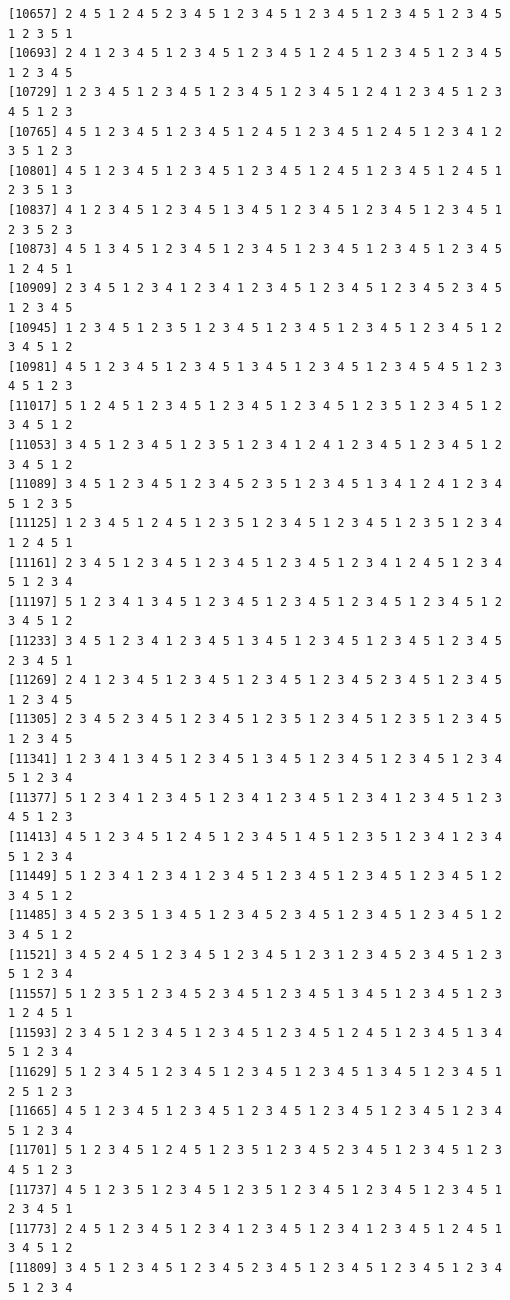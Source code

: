 \documentclass[
  11pt,
]{book}
\begin{document}
\begin{verbatim}
[10657] 2 4 5 1 2 4 5 2 3 4 5 1 2 3 4 5 1 2 3 4 5 1 2 3 4 5 1 2 3 4 5 1 2 3 5 1
[10693] 2 4 1 2 3 4 5 1 2 3 4 5 1 2 3 4 5 1 2 4 5 1 2 3 4 5 1 2 3 4 5 1 2 3 4 5
[10729] 1 2 3 4 5 1 2 3 4 5 1 2 3 4 5 1 2 3 4 5 1 2 4 1 2 3 4 5 1 2 3 4 5 1 2 3
[10765] 4 5 1 2 3 4 5 1 2 3 4 5 1 2 4 5 1 2 3 4 5 1 2 4 5 1 2 3 4 1 2 3 5 1 2 3
[10801] 4 5 1 2 3 4 5 1 2 3 4 5 1 2 3 4 5 1 2 4 5 1 2 3 4 5 1 2 4 5 1 2 3 5 1 3
[10837] 4 1 2 3 4 5 1 2 3 4 5 1 3 4 5 1 2 3 4 5 1 2 3 4 5 1 2 3 4 5 1 2 3 5 2 3
[10873] 4 5 1 3 4 5 1 2 3 4 5 1 2 3 4 5 1 2 3 4 5 1 2 3 4 5 1 2 3 4 5 1 2 4 5 1
[10909] 2 3 4 5 1 2 3 4 1 2 3 4 1 2 3 4 5 1 2 3 4 5 1 2 3 4 5 2 3 4 5 1 2 3 4 5
[10945] 1 2 3 4 5 1 2 3 5 1 2 3 4 5 1 2 3 4 5 1 2 3 4 5 1 2 3 4 5 1 2 3 4 5 1 2
[10981] 4 5 1 2 3 4 5 1 2 3 4 5 1 3 4 5 1 2 3 4 5 1 2 3 4 5 4 5 1 2 3 4 5 1 2 3
[11017] 5 1 2 4 5 1 2 3 4 5 1 2 3 4 5 1 2 3 4 5 1 2 3 5 1 2 3 4 5 1 2 3 4 5 1 2
[11053] 3 4 5 1 2 3 4 5 1 2 3 5 1 2 3 4 1 2 4 1 2 3 4 5 1 2 3 4 5 1 2 3 4 5 1 2
[11089] 3 4 5 1 2 3 4 5 1 2 3 4 5 2 3 5 1 2 3 4 5 1 3 4 1 2 4 1 2 3 4 5 1 2 3 5
[11125] 1 2 3 4 5 1 2 4 5 1 2 3 5 1 2 3 4 5 1 2 3 4 5 1 2 3 5 1 2 3 4 1 2 4 5 1
[11161] 2 3 4 5 1 2 3 4 5 1 2 3 4 5 1 2 3 4 5 1 2 3 4 1 2 4 5 1 2 3 4 5 1 2 3 4
[11197] 5 1 2 3 4 1 3 4 5 1 2 3 4 5 1 2 3 4 5 1 2 3 4 5 1 2 3 4 5 1 2 3 4 5 1 2
[11233] 3 4 5 1 2 3 4 1 2 3 4 5 1 3 4 5 1 2 3 4 5 1 2 3 4 5 1 2 3 4 5 2 3 4 5 1
[11269] 2 4 1 2 3 4 5 1 2 3 4 5 1 2 3 4 5 1 2 3 4 5 2 3 4 5 1 2 3 4 5 1 2 3 4 5
[11305] 2 3 4 5 2 3 4 5 1 2 3 4 5 1 2 3 5 1 2 3 4 5 1 2 3 5 1 2 3 4 5 1 2 3 4 5
[11341] 1 2 3 4 1 3 4 5 1 2 3 4 5 1 3 4 5 1 2 3 4 5 1 2 3 4 5 1 2 3 4 5 1 2 3 4
[11377] 5 1 2 3 4 1 2 3 4 5 1 2 3 4 1 2 3 4 5 1 2 3 4 1 2 3 4 5 1 2 3 4 5 1 2 3
[11413] 4 5 1 2 3 4 5 1 2 4 5 1 2 3 4 5 1 4 5 1 2 3 5 1 2 3 4 1 2 3 4 5 1 2 3 4
[11449] 5 1 2 3 4 1 2 3 4 1 2 3 4 5 1 2 3 4 5 1 2 3 4 5 1 2 3 4 5 1 2 3 4 5 1 2
[11485] 3 4 5 2 3 5 1 3 4 5 1 2 3 4 5 2 3 4 5 1 2 3 4 5 1 2 3 4 5 1 2 3 4 5 1 2
[11521] 3 4 5 2 4 5 1 2 3 4 5 1 2 3 4 5 1 2 3 1 2 3 4 5 2 3 4 5 1 2 3 5 1 2 3 4
[11557] 5 1 2 3 5 1 2 3 4 5 2 3 4 5 1 2 3 4 5 1 3 4 5 1 2 3 4 5 1 2 3 1 2 4 5 1
[11593] 2 3 4 5 1 2 3 4 5 1 2 3 4 5 1 2 3 4 5 1 2 4 5 1 2 3 4 5 1 3 4 5 1 2 3 4
[11629] 5 1 2 3 4 5 1 2 3 4 5 1 2 3 4 5 1 2 3 4 5 1 3 4 5 1 2 3 4 5 1 2 5 1 2 3
[11665] 4 5 1 2 3 4 5 1 2 3 4 5 1 2 3 4 5 1 2 3 4 5 1 2 3 4 5 1 2 3 4 5 1 2 3 4
[11701] 5 1 2 3 4 5 1 2 4 5 1 2 3 5 1 2 3 4 5 2 3 4 5 1 2 3 4 5 1 2 3 4 5 1 2 3
[11737] 4 5 1 2 3 5 1 2 3 4 5 1 2 3 5 1 2 3 4 5 1 2 3 4 5 1 2 3 4 5 1 2 3 4 5 1
[11773] 2 4 5 1 2 3 4 5 1 2 3 4 1 2 3 4 5 1 2 3 4 1 2 3 4 5 1 2 4 5 1 3 4 5 1 2
[11809] 3 4 5 1 2 3 4 5 1 2 3 4 5 2 3 4 5 1 2 3 4 5 1 2 3 4 5 1 2 3 4 5 1 2 3 4

\end{verbatim}
\end{document}
